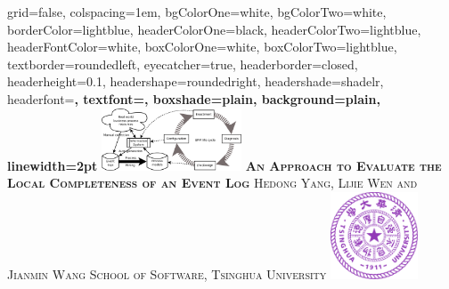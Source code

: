 \documentclass[landscape,final,paperwidth=120cm,paperheight=90cm,fontscale=0.285]{baposter}%
\begin{document}
\begin{poster}%
  {
  grid=false,
  colspacing=1em,
  bgColorOne=white,
  bgColorTwo=white,
  borderColor=lightblue,
  headerColorOne=black,
  headerColorTwo=lightblue,
  headerFontColor=white,
  boxColorOne=white,
  boxColorTwo=lightblue,
  textborder=roundedleft,
  eyecatcher=true,
  headerborder=closed,
  headerheight=0.1\textheight,
  headershape=roundedright,
  headershade=shadelr,
  headerfont=\Large\bf\textsc, %
  textfont={\setlength{\parindent}{1.5em}},
  boxshade=plain,
  background=plain,
  linewidth=2pt
  }
  {\includegraphics[height=5em]{images/bpmlifecycle.pdf}} 
  {\bf\textsc{An Approach to Evaluate the Local Completeness of an Event Log}\vspace{0.5em}}
  {\textsc{Hedong Yang, Lijie Wen and Jianmin Wang\quad
		  School of Software, Tsinghua University}}
  {%
    \includegraphics[height=7.0em]{images/logo}
  }


\end{poster}
\end{document}
